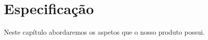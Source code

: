 \chapter{Especificação}

Neste capítulo abordaremos os aspetos que o nosso produto possui.



\newpage

\newpage


\newpage


\newpage


\newpage